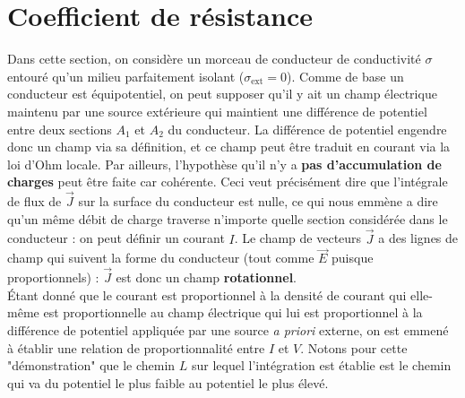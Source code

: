 \documentclass[12pt]{book}
\begin{document}
\section{Coefficient de résistance}
Dans cette section, on considère un morceau de conducteur de conductivité $\sigma$ entouré qu'un milieu parfaitement isolant ($\sigma_{\text{ext}} = 0$). Comme de base un conducteur est équipotentiel, on peut supposer qu'il y ait un champ électrique maintenu par une source extérieure qui maintient une différence de potentiel entre deux sections $A_1$ et $A_2$ du conducteur. La différence de potentiel engendre donc un champ via sa définition, et ce champ peut être traduit en courant via la loi d'Ohm locale. Par ailleurs, l'hypothèse qu'il n'y a \textbf{pas d'accumulation de charges} peut être faite car cohérente. Ceci veut précisément dire que l'intégrale de flux de $\vec{J}$ sur la surface du conducteur est nulle, ce qui nous emmène a dire qu'un même débit de charge traverse n'importe quelle section considérée dans le conducteur : on peut définir un courant $I$. Le champ de vecteurs $\vec{J}$ a des lignes de champ qui suivent la forme du conducteur (tout comme $\vec{E}$ puisque proportionnels) : $\vec{J}$ est donc un champ \textbf{rotationnel}. \\

Étant donné que le courant est proportionnel à la densité de courant qui elle-même est proportionnelle au champ électrique qui lui est proportionnel à la différence de potentiel appliquée par une source \textit{a priori} externe, on est emmené à établir une relation de proportionnalité entre $I$ et $V$. Notons pour cette "démonstration" que le chemin $L$ sur lequel l'intégration est établie est le chemin qui va du potentiel le plus faible au potentiel le plus élevé.
\end{document}
